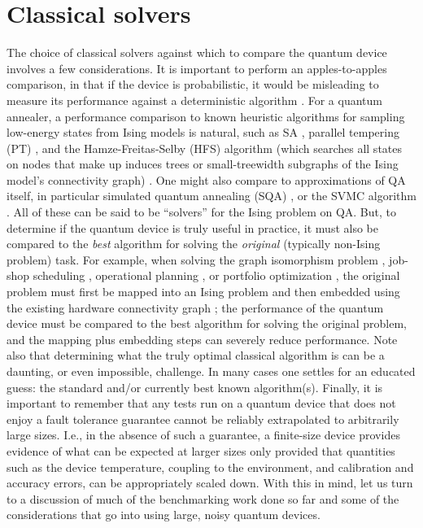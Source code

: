 \section{Classical solvers}
The choice of classical solvers against which to compare the quantum device involves a few considerations. It is important to perform an apples-to-apples comparison, in that if the device is probabilistic, it would be misleading to measure its performance against a deterministic algorithm \cite{McGeoch,q108,MAX2SAT}. For a quantum annealer, a performance comparison to known heuristic algorithms for sampling low-energy states from Ising models is natural, such as SA \cite{kirkpatrick_optimization_1983,Isakov:2015ao}, parallel tempering (PT) \cite{Geyer:91,Earl:2005pd,katzgraber:06a}, and the Hamze-Freitas-Selby (HFS) algorithm (which searches all states on nodes that make up induces trees or small-treewidth subgraphs of the Ising model's connectivity graph) \cite{hamze:04,Selby:2014tx}. One might also compare to approximations of QA itself, in particular simulated quantum annealing (SQA) \cite{sqa1,Heim:2014jf,Crosson:2016fk}, or the SVMC algorithm \cite{SSSV}. All of these can be said to be ``solvers'' for the Ising problem on QA. But, to determine if the quantum device is truly useful in practice, it must also be compared to the \emph{best} algorithm for solving the \emph{original} (typically non-Ising problem) task. For example, when solving the graph isomorphism problem \cite{Zick:2015aa}, job-shop scheduling \cite{Venturelli:2015pi}, operational planning \cite{Rieffel:2015aa}, or portfolio optimization \cite{Rosenberg:2015}, the original problem must first be mapped into an Ising problem \cite{2013arXiv1302.5843L} and then embedded using the existing hardware connectivity graph \cite{Choi1,Choi2,klymko_adiabatic_2012}; the performance of the quantum device must be compared to the best algorithm for solving the original problem, and the mapping plus embedding steps can severely reduce performance. Note also that determining what the truly optimal classical algorithm is can be a daunting, or even impossible, challenge. In many cases one settles for an educated guess: the standard and/or currently best known algorithm(s). Finally, it is important to remember that any tests run on a quantum device that does not enjoy a fault tolerance guarantee cannot be reliably extrapolated to arbitrarily large sizes. I.e., in the absence of such a guarantee, a finite-size device provides evidence of what can be expected at larger sizes only provided that quantities such as the device temperature, coupling to the environment, and calibration and accuracy errors, can be appropriately scaled down. With this in mind, let us turn to a discussion of much of the benchmarking work done so far and some of the considerations that go into using large, noisy quantum devices.

